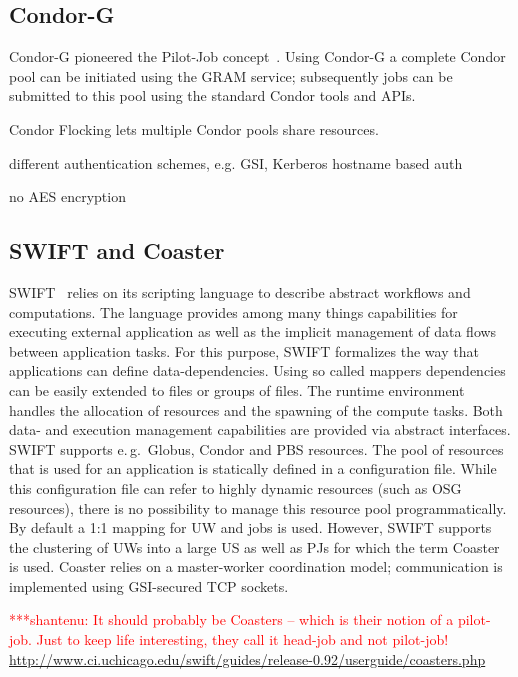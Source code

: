 \documentclass[conference,final]{IEEEtran}
\newcommand{\jhanote}[1]{ {\textcolor{red} { ***shantenu: #1 }}}
\newcommand{\jhanote}[1]{}
\begin{document}
\subsection{Condor-G}

Condor-G pioneered the Pilot-Job concept~\cite{condor-g}. Using Condor-G 
a complete Condor pool can be initiated using the GRAM service; subsequently 
jobs can be submitted to this pool using the standard Condor tools and APIs.

Condor Flocking lets multiple Condor pools share resources.

different authentication schemes, e.g. GSI, Kerberos
hostname based auth

no AES encryption

\subsection{SWIFT and Coaster}

SWIFT~\cite{Wilde2011} relies on its scripting language to describe abstract
workflows and computations. The language provides among many things capabilities
for executing external application as well as the implicit management of data
flows between application tasks. For this purpose, SWIFT formalizes the way that
applications can define data-dependencies. Using so called mappers dependencies
can be easily extended to files or groups of files. The runtime environment
handles the allocation of resources and the spawning of the compute tasks. Both
data- and execution management capabilities are provided via abstract
interfaces. SWIFT supports e.\,g.\ Globus, Condor and PBS resources. The pool of
resources that is used for an application is statically defined in a
configuration file. While this configuration file can refer to highly dynamic
resources (such as OSG resources), there is no possibility to manage this
resource pool programmatically. By default a 1:1 mapping for UW and jobs is
used. However, SWIFT supports the clustering of UWs into a large US as
well as PJs for which the term Coaster~\cite{coasters} is used. Coaster
relies on a master-worker coordination model; communication is implemented using
GSI-secured TCP sockets.



\jhanote{It should probably be Coasters -- which is their notion of a pilot-job.
Just to keep life interesting, they call it head-job and not pilot-job!}
\url{http://www.ci.uchicago.edu/swift/guides/release-0.92/userguide/coasters.php
}
\end{document}
